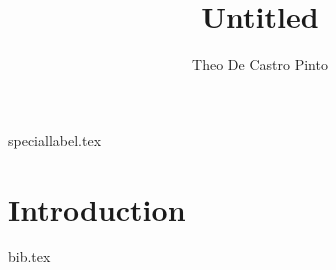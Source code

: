 \documentclass{article}
\title{Untitled}
\author{Theo De Castro Pinto}
\date{}
\begin{document}
\maketitle

\newpage
\tableofcontents
\newpage

{speciallabel.tex}

\newpage

\section{Introduction}

\newpage

{bib.tex}
\end{document}
